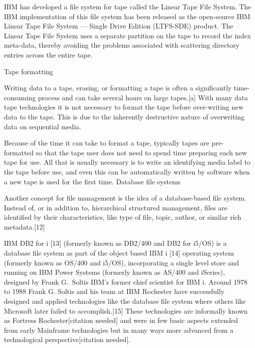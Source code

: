 IBM has developed a file system for tape called the Linear Tape File System. The
IBM implementation of this file system has been released as the open-source IBM
Linear Tape File System — Single Drive Edition (LTFS-SDE) product. The Linear
Tape File System uses a separate partition on the tape to record the index
meta-data, thereby avoiding the problems associated with scattering directory
entries across the entire tape.



Tape formatting



Writing data to a tape, erasing, or formatting a tape is often a significantly
time-consuming process and can take several hours on large tapes.[a] With many
data tape technologies it is not necessary to format the tape before
over-writing new data to the tape. This is due to the inherently destructive
nature of overwriting data on sequential media.



Because of the time it can take to format a tape, typically tapes are
pre-formatted so that the tape user does not need to spend time preparing each
new tape for use. All that is usually necessary is to write an identifying media
label to the tape before use, and even this can be automatically written by
software when a new tape is used for the first time.  Database file systems



Another concept for file management is the idea of a database-based file system.
Instead of, or in addition to, hierarchical structured management, files are
identified by their characteristics, like type of file, topic, author, or
similar rich metadata.[12]



IBM DB2 for i [13] (formerly known as DB2/400 and DB2 for i5/OS) is a database
file system as part of the object based IBM i [14] operating system (formerly
known as OS/400 and i5/OS), incorporating a single level store and running on
IBM Power Systems (formerly known as AS/400 and iSeries), designed by Frank G.\
Soltis IBM's former chief scientist for IBM i. Around 1978 to 1988 Frank G.
Soltis and his team at IBM Rochester have successfully designed and applied
technologies like the database file system where others like Microsoft later
failed to accomplish.[15] These technologies are informally known as Fortress
Rochester[citation needed] and were in few basic aspects extended from early
Mainframe technologies but in many ways more advanced from a technological
perspective[citation needed].



